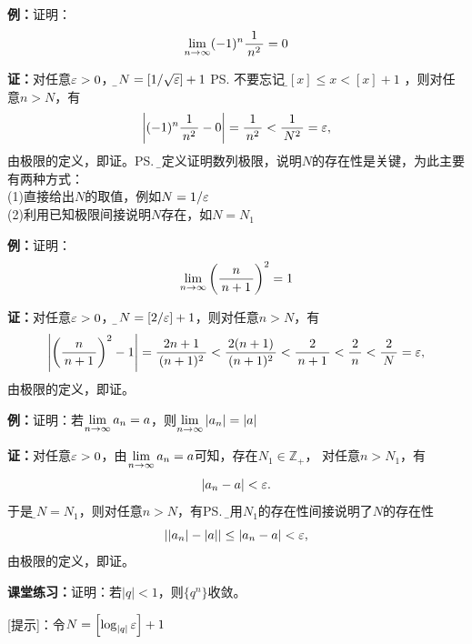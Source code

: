% 

{\bf 例：}证明：
$$\limn(-1)^n\df1{n^2}=0$$

{\bf 证：}对任意$\e>0$，{\b 令$N=\left[1/\sqrt{\e}\right]+1$}
\ps{不要忘记：\b $[x]\leq x<[x]+1$}
，则对任意$n>N$，有
$$\left|(-1)^n\df1{n^2}-0\right|=\df1{n^2}<\df1{N^2}=\e,$$
由极限的定义，即证。\ps{\b 用定义证明数列极限，说明$N$的存在性是关键，为此主要有两种方式：\\
(1)直接给出$N$的取值，例如$N=1/\e$\\
(2)利用已知极限间接说明$N$存在，如$N=N_1$}

{\bf 例：}证明：
$$\limn\left(\df n{n+1}\right)^2=1$$

{\bf 证：}对任意$\e>0$，{\b 令$N=\left[2/\e\right]+1$}，则对任意$n>N$，有
$$\left|\left(\df
n{n+1}\right)^2-1\right|=\df{2n+1}{(n+1)^2}<\df{2(n+1)}{(n+1)^2}
<\df2{n+1}<\df2n<\df2N=\e,$$
由极限的定义，即证。

{\bf 例：}证明：若$\limn a_n=a$，则$\limn|a_n|=|a|$

{\bf 证：}对任意$\e>0$，由$\limn a_n=a$可知，存在$N_1\in\mathbb{Z}_+$，
对任意$n>N_1$，有
$$|a_n-a|<\e.$$
于是{\b 令$N=N_1$}，则对任意$n>N$，有\ps{\b 利用$N_1$的存在性间接说明了$N$的存在性}
$$||a_n|-|a||\leq|a_n-a|<\e,$$
由极限的定义，即证。

{\bf 课堂练习：}证明：若$|q|<1$，则$\{q^n\}$收敛。

[提示]：令$N=\left[\log_{|q|}\e\right]+1$

% 

